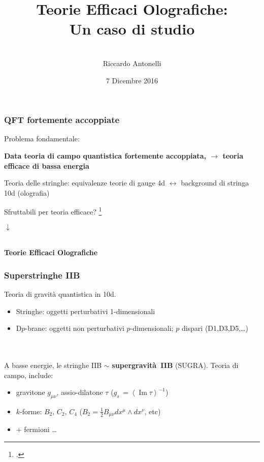 \documentclass[aspectratio=43,mathserif]{beamer}
\title{Teorie Efficaci Olografiche:\\ Un caso di studio}
\author{\vspace{10pt}\\\large Riccardo Antonelli }
\date{7 Dicembre 2016}
\newcommand{\vev}[1]{\left\langle{#1}\right\rangle}
\renewcommand{\Im}{\ensuremath{\operatorname{Im}}}
\begin{document}
\begin{frame}
	\maketitle
\end{frame}

\begin{frame}
	\frametitle{QFT fortemente accoppiate}
	Problema fondamentale:
	\begin{center}\textbf{
		Data teoria di campo quantistica fortemente accoppiata, $\longrightarrow$ teoria efficace di bassa energia}
	\end{center}

	\vfill Teoria delle stringhe: equivalenze teorie di gauge 4d $\leftrightarrow$ background di stringa 10d (olografia)

	\vfill \begin{center}Sfruttabili per teoria efficace? \footcite{MZ}\end{center}

	\begin{center} $\downarrow$

		~\\

		\textbf{Teorie Efficaci Olografiche}
	\end{center}



\end{frame}

\begin{frame}
	\frametitle{Superstringhe IIB}
	Teoria di gravità quantistica in 10d.

	\begin{itemize}
		\item Stringhe: oggetti perturbativi 1-dimensionali
		\item D$p$-brane: oggetti non perturbativi $p$-dimensionali; $p$ dispari (D1,D3,D5,\ldots)
	\end{itemize}

	~\\~\\

	A basse energie, le stringhe IIB $\sim$ \textbf{supergravità~IIB} (SUGRA). Teoria di campo, include:

	\begin{itemize}
		\item gravitone $g_{\mu\nu}$, assio-dilatone $\tau$ \quad \quad (${g_s\, = \vev{\Im \tau}^{-1}}$)
		\item $k$-forme: $B_2$, $C_2$, $C_4$ \quad \quad (${\scriptstyle B_2 = \frac{1}{2} B_{\mu\nu} dx^\mu \wedge dx^\nu}$, etc)
		\item + fermioni \ldots
	\end{itemize}
\end{frame}
\end{document}
